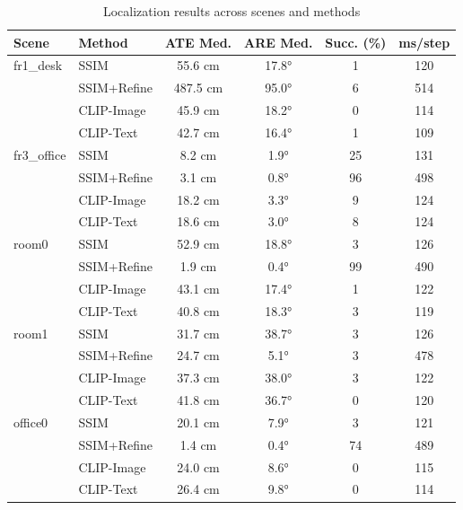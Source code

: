 \begin{table}[t]
\centering
\small
\begin{tabular}{@{}llcccc@{}}
\toprule
\textbf{Scene} & \textbf{Method} & \textbf{ATE Med.} & \textbf{ARE Med.} & \textbf{Succ. (\%)} & \textbf{ms/step} \\
\midrule
  fr1_desk & SSIM & 55.6 cm & 17.8° & 1 & 120 \\
   & SSIM+Refine & 487.5 cm & 95.0° & 6 & 514 \\
   & CLIP-Image & 45.9 cm & 18.2° & 0 & 114 \\
   & CLIP-Text & 42.7 cm & 16.4° & 1 & 109 \\
  fr3_office & SSIM & 8.2 cm & 1.9° & 25 & 131 \\
   & SSIM+Refine & 3.1 cm & 0.8° & 96 & 498 \\
   & CLIP-Image & 18.2 cm & 3.3° & 9 & 124 \\
   & CLIP-Text & 18.6 cm & 3.0° & 8 & 124 \\
  room0 & SSIM & 52.9 cm & 18.8° & 3 & 126 \\
   & SSIM+Refine & 1.9 cm & 0.4° & 99 & 490 \\
   & CLIP-Image & 43.1 cm & 17.4° & 1 & 122 \\
   & CLIP-Text & 40.8 cm & 18.3° & 3 & 119 \\
  room1 & SSIM & 31.7 cm & 38.7° & 3 & 126 \\
   & SSIM+Refine & 24.7 cm & 5.1° & 3 & 478 \\
   & CLIP-Image & 37.3 cm & 38.0° & 3 & 122 \\
   & CLIP-Text & 41.8 cm & 36.7° & 0 & 120 \\
  office0 & SSIM & 20.1 cm & 7.9° & 3 & 121 \\
   & SSIM+Refine & 1.4 cm & 0.4° & 74 & 489 \\
   & CLIP-Image & 24.0 cm & 8.6° & 0 & 115 \\
   & CLIP-Text & 26.4 cm & 9.8° & 0 & 114 \\
\bottomrule
\end{tabular}
\caption{Localization results across scenes and methods}
\end{table}